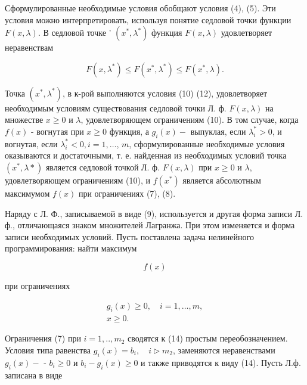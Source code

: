 \documentclass[10pt]{article}
\begin{document}
Сформулированные необходимые условия обобщают условия (4), (5). Эти условия можно интерпретировать, используя понятие седловой точки функции $F(x, \lambda)$. В седловой точке ' $\left(x^{*}, \lambda^{*}\right)$ функция $F(x, \lambda)$ удовлетворяет неравенствам



\[

F\left(x, \lambda^{*}\right) \leqslant F\left(x^{*}, \lambda^{*}\right) \leqslant F\left(x^{*}, \lambda\right) .

\]



Точка $\left(x^{*}, \lambda^{*}\right)$, в к-рой выполняются условия (10) (12), удовлетворяет необходимым условиям существования седловой точки Л. ф. $F(x, \lambda)$ на множестве $x \geqslant 0$ и $\lambda$, удовлетворяющем ограничениям (10). В том случае, когда $f(x)$ - вогнутая при $x \geqslant 0$ функция, а $g_{i}(x)-$ выпуклая, если $\lambda_{i}^{*}>0$, и вогнутая, если $\lambda_{i}^{*}<0, i=1, \ldots$, $m$, сформулированные необходимые условия оказываются и достаточными, т. е. найденная из необходимых условий точка $\left(x^{*}, \lambda *\right)$ является седловой точкой Л. ф. $F(x, \lambda)$ при $x \geqslant 0$ и $\lambda$, удовлетворяющем ограничениям (10), и $f\left(x^{*}\right)$ является абсолютным максимумом $f(x)$ при ограничениях (7), (8).



Наряду с Л. Ф., записываемой в виде (9), используется и другая форма записи Л. ф., отличающаяся знаком множителей Лагранжа. При этом изменяется и форма записи необходимых условий. Пусть поставлена задача нелинейного программирования: найти максимум



\[

f(x)

\]



при ограничениях



\[

\begin{gathered}

g_{i}(x) \geqslant 0, \quad i=1, \ldots, m, \\

x \geqslant 0 .

\end{gathered}

\]



Ограничения (7) при $i=1, . ., m_{2}$ сводятся к (14) простым переобозначением. Условия типа равенства $g_{i}(x)=b_{i}, \quad i \triangleright m_{2}$, заменяются неравенствами $g_{i}(x)-$ - $b_{i} \geqslant 0$ и $b_{i}-g_{i}(x) \geqslant 0$ и также приводятся к виду (14). Пусть Л.ф. записана в виде
\end{document}
